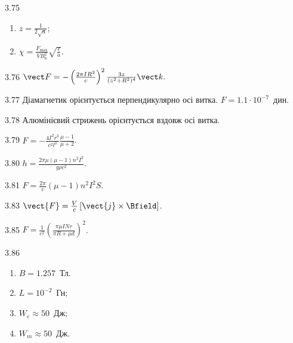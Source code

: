 \begin{Solution}{3.{75}}

\begin{enumerate}[label=\alph*)]
    \item $z = \frac{1}{2\sqrt{a}}$;
    \item $\chi = \frac{F_{\max}}{V B_0^2 }\sqrt{\frac{e}{a}}$.
\end{enumerate}


\end{Solution}
\begin{Solution}{3.{76}}
	$\vect F = - \left( \frac{2\pi IR^2}{c}\right)^2 \frac{3z}{(z^2 + R^2)^4} \vect k.$
\end{Solution}
\begin{Solution}{3.{77}}
	Діамагнетик орієнтується перпендикулярно осі витка. $F = 1.1\cdot 10^{-7}$~дин.
\end{Solution}
\begin{Solution}{3.{78}}
	Алюмінієвий стрижень орієнтується вздовж осі витка.
\end{Solution}
\begin{Solution}{3.{79}}
	$F = - \frac{4I^2r^3}{c^2l^3}\frac{\mu - 1}{\mu + 2}$.
\end{Solution}
\begin{Solution}{3.{80}}
	$h = \frac{2\pi\mu(\mu - 1)n^2 I^2}{g\rho c^2}$.
\end{Solution}
\begin{Solution}{3.{81}}
	$F = \frac{2\pi}{c} (\mu - 1) n^2 I^2S$.
\end{Solution}
\begin{Solution}{3.{83}}
	$\vect{F} = \frac{V}{c} \left[ \vect{j}\times\Bfield\right] $.
\end{Solution}
\begin{Solution}{3.{85}}
	$F = \frac1{c^2}\left( \frac{\pi\mu I N r}{\pi R + \mu d}\right)^2$.
\end{Solution}
\begin{Solution}{3.{86}}
\begin{enumerate}[label=\alph*)]
	\item $B = 1.257$~Тл.
	\item $L = 10^{-2}$~Гн;
	\item $W_e \approx 50$~Дж;
	\item  $W_m \approx 50$~Дж.
\end{enumerate}
\end{Solution}
